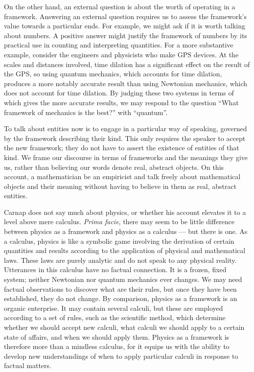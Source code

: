 \documentclass[12pt]{article}
\begin{document}
On the other hand, an external question is about the worth of operating in a framework. Answering an external question requires us to assess the framework's value towards a particular ends. For example, we might ask if it is worth talking about numbers. A positive answer might justify the framework of numbers by its practical use in counting and interpreting quantities. For a more substantive example, consider the engineers and physicists who make GPS devices. At the scales and distances involved, time dilation has a significant effect on the result of the GPS, so using quantum mechanics, which accounts for time dilation, produces a more notably accurate result than using Newtonian mechanics, which does not account for time dilation. By judging these two systems in terms of which gives the more accurate results, we may respond to the question ``What framework of mechanics is the best?'' with ``quantum''.

To talk about entities now is to engage in a particular way of speaking, governed by the framework describing their kind. This only requires the speaker to accept the new framework; they do not have to assert the existence of entities of that kind. We frame our discourse in terms of frameworks and the meanings they give us, rather than believing our words denote real, abstract objects. On this account, a mathematician be an empiricist and talk freely about mathematical objects and their meaning without having to believe in them as real, abstract entities.

Carnap does not say much about physics, or whether his account elevates it to a level above mere calculus. \textit{Prima facie}, there may seem to be little difference between physics as a framework and physics as a calculus --- but there is one. As a calculus, physics is like a symbolic game involving the derivation of certain quantities and results according to the application of physical and mathematical laws. These laws are purely analytic and do not speak to any physical reality. Utterances in this calculus have no factual connection. It is a frozen, fixed system; neither Newtonian nor quantum mechanics ever changes. We may need factual observations to discover what are their rules, but once they have been established, they do not change. By comparison, physics as a framework is an organic enterprise. It may contain several calculi, but these are employed according to a set of rules, such as the scientific method, which determine whether we should accept new calculi, what calculi we should apply to a certain state of affairs, and when we should apply them. Physics as a framework is therefore more than a mindless calculus, for it equips us with the ability to develop new understandings of when to apply particular calculi in response to factual matters.
\end{document}
